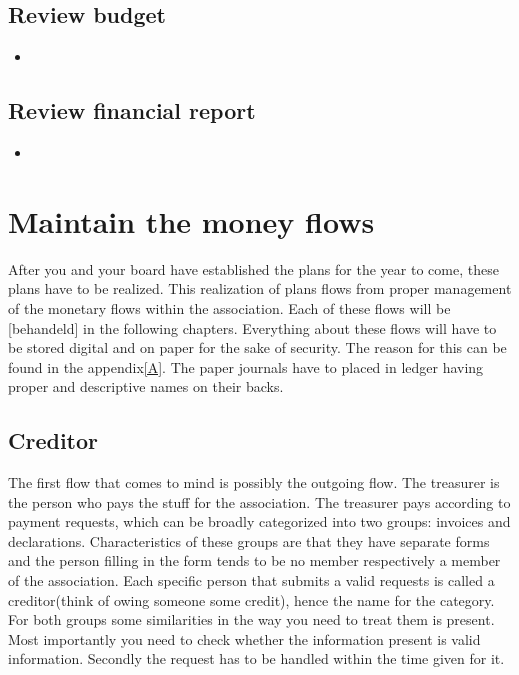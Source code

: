 \documentclass{report}
\begin{document}
\subsection{Review budget}
\begin{itemize}
\vspace{-1mm}
\itemsep-1mm 
\item
\end{itemize}

\subsection{Review financial report}
\begin{itemize} 
\vspace{-1mm}
\itemsep-1mm 
\item 
\end{itemize}

\section{Maintain the money flows}
After you and your board have established the plans for the year to come, these plans have to be realized. This realization of plans flows from proper management of the monetary flows within the association. Each of these flows will be [behandeld] in the following chapters. Everything about these flows will have to be stored digital and on paper for the sake of security. The reason for this can be found in the appendix\ref{A}. The paper journals have to placed in ledger having proper and descriptive names on their backs.   

\subsection{Creditor}
The first flow that comes to mind is possibly the outgoing flow. The treasurer is the person who pays the stuff for the association. The treasurer pays according to payment requests, which can be broadly categorized into two groups: invoices and declarations. Characteristics of these groups are that they have separate forms and the person filling in the form tends to be no member respectively a member of the association. Each specific person that submits a valid requests is called a creditor(think of owing someone some credit), hence the name for the category. For both groups some similarities in the way you need to treat them is present. Most importantly you need to check whether the information present is valid information. Secondly the request has to be handled within the time given for it.          
\end{document}
